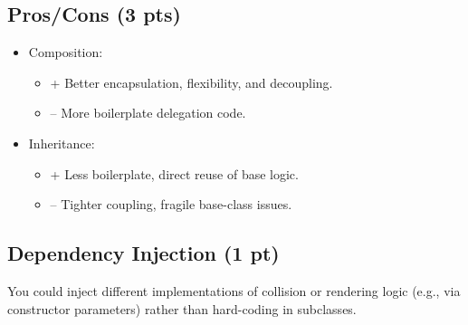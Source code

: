 \documentclass[12pt]{article}
\begin{document}
\subsection{Pros/Cons (3 pts)}
\begin{itemize}
\item Composition:
\begin{itemize}
\item + Better encapsulation, flexibility, and decoupling.
\item – More boilerplate delegation code.
\end{itemize}
\item Inheritance:
\begin{itemize}
\item + Less boilerplate, direct reuse of base logic.
\item – Tighter coupling, fragile base-class issues.
\end{itemize}
\end{itemize}

\subsection{Dependency Injection (1 pt)}
You could inject different implementations of collision or rendering logic (e.g., via constructor parameters) rather than hard-coding in subclasses.
\end{document}
